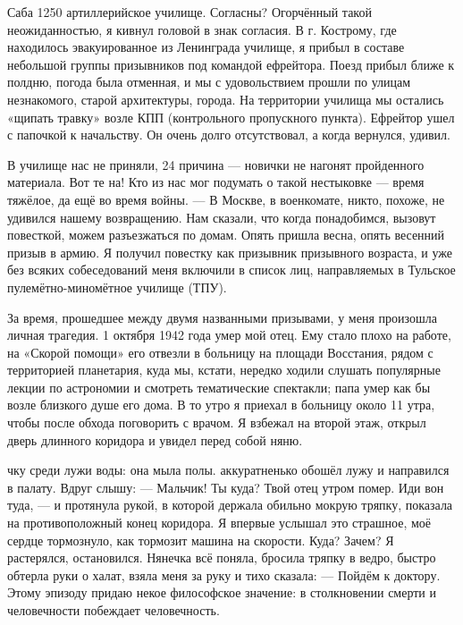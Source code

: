 \label{250-1}
Саба 1250 артиллерийское училище. Согласны? Огорчённый такой неожиданностью, я кивнул головой в знак согласия. В г. Кострому, где находилось эвакуированное из Ленинграда училище, я прибыл в составе небольшой группы призывников под командой ефрейтора. Поезд прибыл ближе к полдню, погода была отменная, и мы с удовольствием прошли по улицам незнакомого, старой архитектуры, города. На территории училища мы остались «щипать травку» возле КПП (контрольного пропускного пункта). Ефрейтор ушел с папочкой к начальству. Он очень долго отсутствовал, а когда вернулся, удивил.

\label{251-1}
В училище нас не приняли, 24 причина — новички не нагонят пройденного материала. Вот те на! Кто из нас мог подумать о такой нестыковке — время тяжёлое, да ещё во время войны. — В Москве, в военкомате, никто, похоже, не удивился нашему возвращению. Нам сказали, что когда понадобимся, вызовут повесткой, можем разъезжаться по домам. Опять пришла весна, опять весенний призыв в армию. Я получил повестку как призывник призывного возраста, и уже без всяких собеседований меня включили в список лиц, направляемых в Тульское пулемётно-миномётное училище (ТПУ).

\label{252-1}
За время, прошедшее между двумя названными призывами, у меня произошла личная трагедия. 1 октября 1942 года умер мой отец. Ему стало плохо на работе, на «Скорой помощи» его отвезли в больницу на площади Восстания, рядом с территорией планетария, куда мы, кстати, нередко ходили слушать популярные лекции по астрономии и смотреть тематические спектакли; папа умер как бы возле близкого душе его дома. В то утро я приехал в больницу около 11 утра, чтобы после обхода поговорить с врачом. Я взбежал на второй этаж, открыл дверь длинного коридора и увидел перед собой няню.

\label{253-1}
чку среди лужи воды: она мыла полы. аккуратненько обошёл лужу и направился в палату. Вдруг слышу: — Мальчик! Ты куда? Твой отец утром помер. Иди вон туда, — и протянула рукой, в которой держала обильно мокрую тряпку, показала на противоположный конец коридора. Я впервые услышал это страшное, моё сердце тормознуло, как тормозит машина на скорости. Куда? Зачем? Я растерялся, остановился. Нянечка всё поняла, бросила тряпку в ведро, быстро обтерла руки о халат, взяла меня за руку и тихо сказала: — Пойдём к доктору. Этому эпизоду придаю некое философское значение: в столкновении смерти и человечности побеждает человечность.